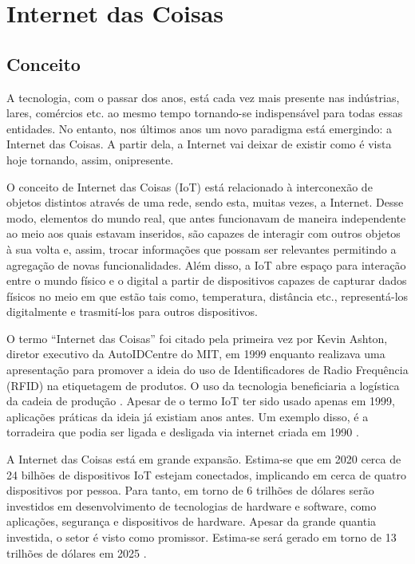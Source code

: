 \chapter{Internet das Coisas}

\section{Conceito}




A tecnologia, com o passar dos anos, está cada vez mais presente nas indústrias, lares, comércios 
etc. ao mesmo tempo tornando-se indispensável para todas essas entidades. No entanto, nos últimos 
anos um novo paradigma está emergindo: a Internet das Coisas. A partir dela, a Internet vai deixar 
de existir como é vista hoje tornando, assim, onipresente.


O conceito de Internet das Coisas (IoT) está relacionado à interconexão de objetos distintos 
através de uma rede, sendo esta, muitas vezes, a Internet. Desse modo, elementos do mundo real, que 
antes funcionavam de maneira independente ao meio aos quais estavam inseridos, são capazes de 
interagir com outros objetos à sua volta e, assim, trocar informações que possam ser relevantes 
permitindo a agregação de novas funcionalidades.  Além disso, a IoT abre espaço para interação 
entre o mundo físico e o digital a partir de dispositivos capazes de capturar dados físicos no meio 
em que estão tais como, temperatura, distância etc., representá-los digitalmente e trasmití-los 
para outros dispositivos.

	
O termo ``Internet das Coisas'' foi citado pela primeira vez por Kevin Ashton, diretor executivo da 
AutoIDCentre do MIT, em 1999 enquanto realizava uma apresentação para promover a ideia do uso de 
Identificadores de Radio Frequência (RFID) na etiquetagem de produtos. O uso da tecnologia 
beneficiaria a logística da cadeia de produção \cite{kevin-ashton}. Apesar de o termo IoT ter sido 
usado apenas em 1999, aplicações práticas da ideia já existiam anos antes. Um exemplo disso, é a 
torradeira que podia ser ligada e desligada via internet criada em 1990 \cite{survey-suresh}.




A Internet das Coisas está em grande expansão. Estima-se que em 2020 cerca de 24 bilhões de 
dispositivos IoT estejam conectados, implicando em cerca de quatro dispositivos por pessoa. Para 
tanto, em torno de 6 trilhões de dólares serão investidos em desenvolvimento de tecnologias de 
hardware e software, como aplicações, segurança e dispositivos de hardware. Apesar da grande 
quantia investida, o setor é visto como promissor. Estima-se será gerado em torno de 13 trilhões de 
dólares 
em 2025 \cite{andrewmeola2016}. 

